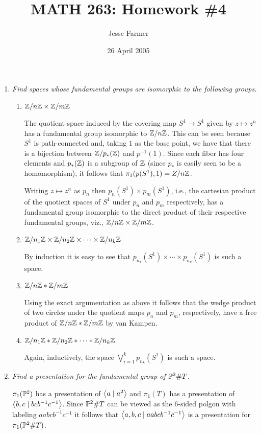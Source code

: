 \documentclass[10pt]{article}
\title{MATH 263: Homework \#4}
\author{Jesse Farmer}
\date{26 April 2005}
\begin{document}
\maketitle

\begin{enumerate}
\item \emph{Find spaces whose fundamental groups are isomorphic to the following groups.}
\begin{enumerate}
\item \emph{$\Z/n\Z \times \Z/m\Z$}

The quotient space induced by the covering map $S^1 \rightarrow S^1$ given by $z \mapsto z^n$ has a fundamental group isomorphic to $\Z/n\Z$.  This can be seen because $S^1$ is path-connected and, taking $1$ as the base point, we have that there is a bijection between $\Z / p_\ast(\Z)$ and $p^{-1}(1)$.  Since each fiber has four elements and $p_\ast(\Z)$ is a subgroup of $\Z$ (since $p_\ast$ is easily seen to be a homomorphism), it follows that $\pi_1(p(S^1), 1) = Z/n\Z$.

Writing $z \mapsto z^n$ as $p_n$ then $p_n(S^1) \times p_m(S^1)$, i.e., the cartesian product of the quotient spaces of $S^1$ under $p_n$ and $p_m$ respectively, has a fundamental group isomorphic to the direct product of their respective fundamental groups, viz., $\Z/n\Z \times \Z/m\Z$.

\item \emph{$\Z/n_1\Z \times \Z/n_2\Z \times \cdots \times \Z/n_k\Z$}

By induction it is easy to see that $p_{n_1}(S^1) \times \cdots \times p_{n_k}(S^1)$ is such a space.
\item \emph{$\Z/n\Z \ast \Z/m\Z$}

Using the exact argumentation as above it follows that the wedge product of two circles under the quotient maps $p_n$ and $p_m$, respectively, have a free product of $\Z/n\Z \ast \Z/m\Z$ by van Kampen.

\item \emph{$\Z/n_1\Z \ast \Z/n_2\Z \ast \cdots \ast \Z/n_k\Z$}

Again, inductively, the space $\bigvee_{i=1}^k p_{n_k}(S^1)$ is such a space.
\end{enumerate}

\item \emph{Find a presentation for the fundamental group of $\P^2 \# T$.}

$\pi_1(\P^2)$ has a presentation of $\brac{a \mid a^2}$ and $\pi_1(T)$ has a presentation of $\brac{b,c \mid bcb^{-1}c^{-1}}$.  Since $\P^2 \# T$ can be viewed as the $6$-sided polgon with labeling $aabcb^{-1}c^{-1}$ it follows that $\brac{a,b,c \mid aabcb^{-1}c^{-1}}$ is a presentation for $\pi_1(\P^2 \# T)$.


\end{enumerate}
\end{document}

